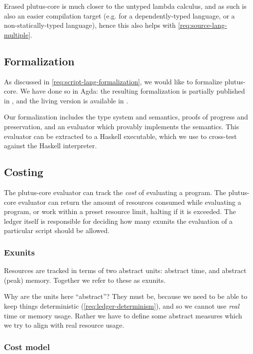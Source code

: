 Erased \gls{plutus-core} is much closer to the untyped lambda calculus, and as such is also an easier compilation target (e.g. for a dependently-typed language, or a non-statically-typed language), hence this also helps with \cref{req:source-lang-multiple}.

\subsection{Formalization}

As discussed in \cref{req:script-lang-formalization}, we would like to formalize \gls{plutus-core}.
We have done so in Agda: the resulting formalization is partially published in \textcite{chapman2019system}, and the living version is available in \textcite{plutus-repo}.

Our formalization includes the type system and semantics, proofs of progress and preservation, and an evaluator which provably implements the semantics.
This evaluator can be extracted to a Haskell executable, which we use to cross-test against the Haskell interpreter.

\subsection{Costing}
\label{sec:costing}

The \gls{plutus-core} evaluator can track the \emph{cost} of evaluating a program.
The \gls{plutus-core} evaluator can return the amount of resources consumed while evaluating a program, or work within a preset resource limit, halting if it is exceeded.
The ledger itself is responsible for deciding how many \gls{exunits} the evaluation of a particular \gls{script} should be allowed.

\subsubsection{Exunits}

Resources are tracked in terms of two abstract units: abstract time, and abstract (peak) memory.
Together we refer to these as \gls{exunits}.

Why are the units here ``abstract''?
They must be, because we need to be able to keep things deterministic (\cref{req:ledger-determinism}), and so we cannot use \emph{real} time or memory usage.
Rather we have to define some abstract measures which we try to align with real resource usage.

\subsubsection{Cost model}


